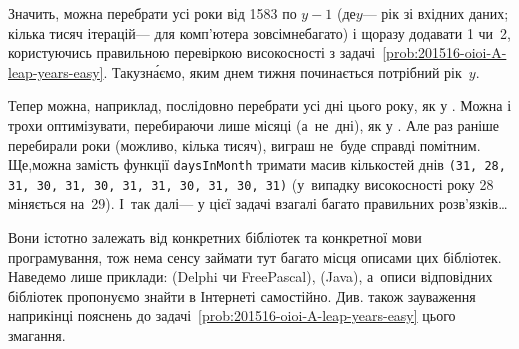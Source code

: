 Значить, можна перебрати усі роки від 1583 по $y{-}1$ (де\nolinebreak[3] $y$\nolinebreak[3] --- рік зі вхідних даних; кілька тисяч ітерацій\nolinebreak[3] --- для комп'ютера зовсім\nolinebreak[2] не\nolinebreak[3] багато) і щоразу додавати 1 чи~2, користуючись правильною перевіркою високосності з задачі~\ref{prob:201516-oioi-A-leap-years-easy}. Так\nolinebreak[2] узн\'{а}ємо, яким днем тижня починається  потрібний рік~$y$.

Тепер можна, наприклад, послідовно перебрати усі дні цього року, як у . Можна і трохи оптимізувати, перебираючи лише місяці (а~не~дні), як у . Але раз раніше перебирали роки (можливо, кілька тисяч), виграш не~буде справді помітним. Ще,\nolinebreak[2] можна замість функції \verb|daysInMonth| тримати масив кількостей днів \texttt{(31, 28, 31, 30, 31, 30, 31, 31, 30, 31, 30, 31)} (у~випадку високосності року 28 міняється на~29). І~так далі\nolinebreak[3] --- у цієї задачі взагалі багато правильних розв'язків\dots

 Вони істотно залежать від конкретних бібліотек та конкретної мови програмування, тож нема сенсу займати тут багато місця описами цих бібліотек. Наведемо лише приклади:  (Delphi чи \mbox{Free}\discretionary{}{}{}\mbox{Pascal}),  (Java), а~описи відповідних бібліотек пропонуємо знайти в Інтернеті самостійно.
Див. також зауваження наприкінці пояснень до задачі~\ref{prob:201516-oioi-A-leap-years-easy} цього змагання.